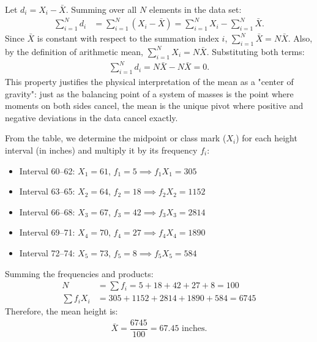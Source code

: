 \begin{solproblema}[prob:0b934f5]
	Let $d_{i} = X_{i} - \bar{X}$. Summing over all $N$ elements in the data set:
	\begin{align}
		\sum_{i=1}^{N} d_{i} &= \sum_{i=1}^{N} (X_{i} - \bar{X}) = \sum_{i=1}^{N} X_{i} - \sum_{i=1}^{N} \bar{X}.
	\end{align}
	Since $\bar{X}$ is constant with respect to the summation index $i$, $\sum_{i=1}^{N} \bar{X} = N\bar{X}$. Also, by the definition of arithmetic mean, $\sum_{i=1}^{N} X_{i} = N\bar{X}$. Substituting both terms:
	\begin{align}
		\sum_{i=1}^{N} d_{i} = N\bar{X} - N\bar{X} = 0.
	\end{align}
	This property justifies the physical interpretation of the mean as a "center of gravity": just as the balancing point of a system of masses is the point where moments on both sides cancel, the mean is the unique pivot where positive and negative deviations in the data cancel exactly.
\end{solproblema}

\begin{solproblema}[prob:0c7ed43]
	From the table, we determine the midpoint or class mark ($X_{i}$) for each height interval (in inches) and multiply it by its frequency $f_{i}$:
	\begin{itemize}
		\item Interval 60--62: $X_{1} = 61$, $f_{1} = 5 \implies f_{1}X_{1} = 305$
		\item Interval 63--65: $X_{2} = 64$, $f_{2} = 18 \implies f_{2}X_{2} = 1152$
		\item Interval 66--68: $X_{3} = 67$, $f_{3} = 42 \implies f_{3}X_{3} = 2814$
		\item Interval 69--71: $X_{4} = 70$, $f_{4} = 27 \implies f_{4}X_{4} = 1890$
		\item Interval 72--74: $X_{5} = 73$, $f_{5} = 8 \implies f_{5}X_{5} = 584$
	\end{itemize}
	Summing the frequencies and products:
	\begin{align}
		N &= \sum f_{i} = 5 + 18 + 42 + 27 + 8 = 100 \\
		\sum f_{i}X_{i} &= 305 + 1152 + 2814 + 1890 + 584 = 6745
	\end{align}
	Therefore, the mean height is:
	\begin{align}
		\bar{X} = \dfrac{6745}{100} = 67.45 \text{ inches.}
	\end{align}
\end{solproblema}

